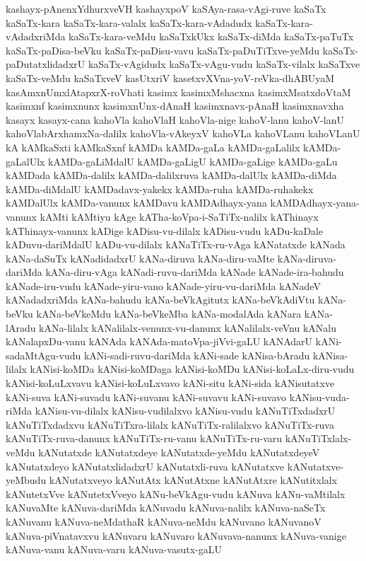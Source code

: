 {kashayx-pAnenxYdhurxveVH
kashayxpoV
kaSAya-rasa-vAgi-ruve
kaSaTx
kaSaTx-kara
kaSaTx-kara-valalx
kaSaTx-kara-vAdadudx
kaSaTx-kara-vAdadxriMda
kaSaTx-kara-veMdu
kaSaTxkUkx
kaSaTx-diMda
kaSaTx-paTuTx
kaSaTx-paDisa-beVku
kaSaTx-paDisu-vavu
kaSaTx-paDuTiTxve-yeMdu
kaSaTx-paDutatxlidadxrU
kaSaTx-vAgidudx
kaSaTx-vAgu-vudu
kaSaTx-vilalx
kaSaTxve
kaSaTx-veMdu
kaSaTxveV
kasUtxriV
kasetxvXVna-yoV-reVka-dhABUyaM
kasAmxnUmxlAtapxrX-roVhati
kasimx
kasimxMshacxna
kasimxMsatxdoVtaM
kasimxnf
kasimxnunx
kasimxnUnx-dAnaH
kasimxnavx-pAnaH
kasimxnavxha
kasayx
kasayx-cana
kahoVla
kahoVlaH
kahoVla-nige
kahoV-lanu
kahoV-lanU
kahoVlabArxhamxNa-dalilx
kahoVla-vAkeyxV
kahoVLa
kahoVLanu
kahoVLanU
kA
kAMkaSxti
kAMkaSxnf
kAMDa
kAMDa-gaLa
kAMDa-gaLalilx
kAMDa-gaLalUlx
kAMDa-gaLiMdalU
kAMDa-gaLigU
kAMDa-gaLige
kAMDa-gaLu
kAMDada
kAMDa-dalilx
kAMDa-dalilxruva
kAMDa-dalUlx
kAMDa-diMda
kAMDa-diMdalU
kAMDadavx-yakekx
kAMDa-ruha
kAMDa-ruhakekx
kAMDalUlx
kAMDa-vanunx
kAMDavu
kAMDAdhayx-yana
kAMDAdhayx-yana-vanunx
kAMti
kAMtiyu
kAge
kATha-koVpa-i-SaTiTx-nalilx
kAThinayx
kAThinayx-vanunx
kADige
kADisu-vu-dilalx
kADisu-vudu
kADu-kaDale
kADuvu-dariMdalU
kADu-vu-dilalx
kANaTiTx-ru-vAga
kANatatxde
kANada
kANa-daSuTx
kANadidadxrU
kANa-diruva
kANa-diru-vaMte
kANa-diruva-dariMda
kANa-diru-vAga
kANadi-ruvu-dariMda
kANade
kANade-ira-bahudu
kANade-iru-vudu
kANade-yiru-vano
kANade-yiru-vu-dariMda
kANadeV
kANadadxriMda
kANa-bahudu
kANa-beVkAgitutx
kANa-beVkAdiVtu
kANa-beVku
kANa-beVkeMdu
kANa-beVkeMba
kANa-modalAda
kANara
kANa-lAradu
kANa-lilalx
kANalilalx-venunx-vu-danunx
kANalilalx-veVnu
kANalu
kANalapxDu-vanu
kANAda
kANAda-matoVpa-jiVvi-gaLU
kANAdarU
kANi-sadaMtAgu-vudu
kANi-sadi-ruvu-dariMda
kANi-sade
kANisa-bAradu
kANisa-lilalx
kANisi-koMDa
kANisi-koMDaga
kANisi-koMDu
kANisi-koLaLx-diru-vudu
kANisi-koLuLxvavu
kANisi-koLuLxvavo
kANi-situ
kANi-sida
kANisutatxve
kANi-suva
kANi-suvadu
kANi-suvanu
kANi-suvavu
kANi-suvavo
kANisu-vuda-riMda
kANisu-vu-dilalx
kANisu-vudilalxvo
kANisu-vudu
kANuTiTxdadxrU
kANuTiTxdadxvu
kANuTiTxra-lilalx
kANuTiTx-ralilalxvo
kANuTiTx-ruva
kANuTiTx-ruva-danunx
kANuTiTx-ru-vanu
kANuTiTx-ru-varu
kANuTiTxlalx-veMdu
kANutatxde
kANutatxdeye
kANutatxde-yeMdu
kANutatxdeyeV
kANutatxdeyo
kANutatxlidadxrU
kANutatxli-ruva
kANutatxve
kANutatxve-yeMbudu
kANutatxveyo
kANutAtx
kANutAtxne
kANutAtxre
kANutitxlalx
kANutetxVve
kANutetxVveyo
kANu-beVkAgu-vudu
kANuva
kANu-vaMtilalx
kANuvaMte
kANuva-dariMda
kANuvadu
kANuva-nalilx
kANuva-naSeTx
kANuvanu
kANuva-neMdathaR
kANuva-neMdu
kANuvano
kANuvanoV
kANuva-piVnatavxvu
kANuvaru
kANuvaro
kANuvava-nanunx
kANuva-vanige
kANuva-vanu
kANuva-varu
kANuva-vasutx-gaLU
}
